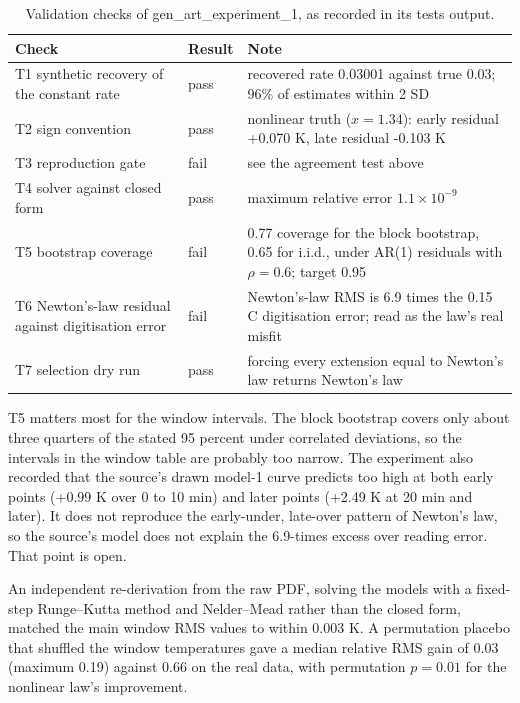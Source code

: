 \documentclass[11pt,letterpaper]{article}
\begin{document}
\begin{table}[!htbp]
\centering
\small
\caption{Validation checks of gen\_art\_experiment\_1, as recorded in its tests output.}
\label{tab:it1-checks}
\begin{tabularx}{\linewidth}{p{4.2cm}p{1.5cm}X}
\toprule
Check & Result & Note \\
\midrule
T1 synthetic recovery of the constant rate & pass & recovered rate 0.03001 against true 0.03; 96\% of estimates within 2 SD \\
T2 sign convention & pass & nonlinear truth ($x = 1.34$): early residual +0.070 K, late residual -0.103 K \\
T3 reproduction gate & fail & see the agreement test above \\
T4 solver against closed form & pass & maximum relative error $1.1 \times 10^{-9}$ \\
T5 bootstrap coverage & fail & 0.77 coverage for the block bootstrap, 0.65 for i.i.d., under AR(1) residuals with $\rho = 0.6$; target 0.95 \\
T6 Newton's-law residual against digitisation error & fail & Newton's-law RMS is 6.9 times the 0.15 C digitisation error; read as the law's real misfit \\
T7 selection dry run & pass & forcing every extension equal to Newton's law returns Newton's law \\
\bottomrule
\end{tabularx}
\end{table}

T5 matters most for the window intervals. The block bootstrap covers only about three quarters of the stated 95 percent under correlated deviations, so the intervals in the window table are probably too narrow. The experiment also recorded that the source's drawn model-1 curve predicts too high at both early points (+0.99 K over 0 to 10 min) and later points (+2.49 K at 20 min and later). It does not reproduce the early-under, late-over pattern of Newton's law, so the source's model does not explain the 6.9-times excess over reading error. That point is open.

An independent re-derivation from the raw PDF, solving the models with a fixed-step Runge--Kutta method and Nelder--Mead rather than the closed form, matched the main window RMS values to within 0.003 K. A permutation placebo that shuffled the window temperatures gave a median relative RMS gain of 0.03 (maximum 0.19) against 0.66 on the real data, with permutation $p = 0.01$ for the nonlinear law's improvement.
\end{document}
